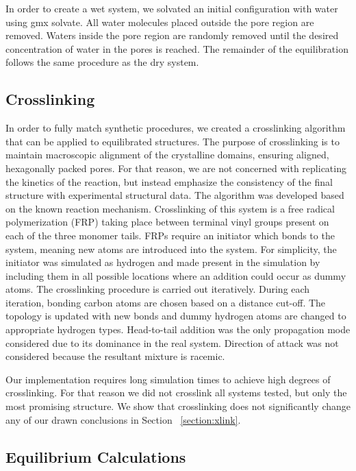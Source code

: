 \documentclass{article}
\begin{document}
  In order to create a wet system, we solvated an initial configuration with
  water using gmx solvate. All water molecules placed outside the pore region are
  removed. Waters inside the pore region are randomly removed until the desired
  concentration of water in the pores is reached. The remainder of the
  equilibration follows the same procedure as the dry system. 

  \subsection{Crosslinking}
  

  In order to fully match synthetic procedures, we created a crosslinking
  algorithm that can be applied to equilibrated structures. The purpose of 
  crosslinking
  is to maintain macroscopic alignment of the crystalline domains, 
  ensuring aligned, hexagonally packed pores. For that reason, we are not
  concerned with replicating the kinetics of the reaction, but instead emphasize
  the consistency of the final structure with experimental structural data. The
  algorithm was developed based on the known reaction mechanism. Crosslinking of
  this system is a free radical polymerization (FRP) taking place between
  terminal vinyl groups present on each of the three monomer tails. FRPs require
  an initiator which bonds to the system, meaning new atoms are introduced into
  the system. For simplicity, the initiator was simulated as hydrogen and made
  present in the simulation by including them in all possible locations where an 
  addition could occur as dummy atoms. The crosslinking procedure is carried out
  iteratively. During each iteration, bonding carbon atoms are chosen based on
  a distance cut-off. The topology is updated with new bonds and dummy hydrogen
  atoms are changed to appropriate hydrogen types. Head-to-tail addition was the
  only propagation mode considered due to its dominance in the real system.
  Direction of attack was not considered because the resultant mixture is
  racemic.

  Our implementation requires long simulation times to achieve high degrees
  of crosslinking. For that reason we did not crosslink all systems tested, but only the most
  promising structure. We show that crosslinking does not significantly 
  change any of our drawn conclusions in Section ~\ref{section:xlink}.

  \subsection{Equilibrium Calculations}
\end{document}

